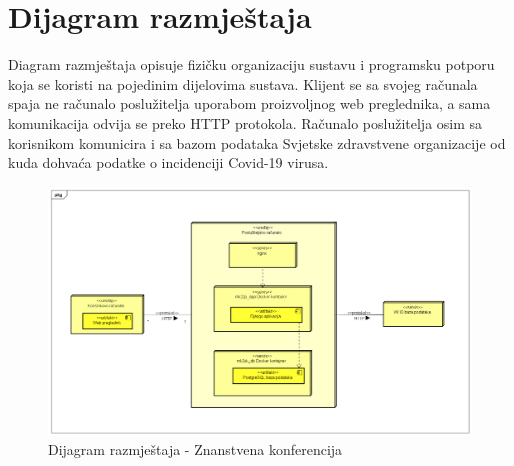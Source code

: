 		
		\section{Dijagram razmještaja}
		
		Diagram razmještaja opisuje fizičku organizaciju sustavu i programsku potporu koja se koristi na pojedinim dijelovima sustava. Klijent se sa svojeg računala spaja ne računalo poslužitelja uporabom proizvoljnog web preglednika, a sama komunikacija odvija se preko HTTP protokola. Računalo poslužitelja osim sa korisnikom komunicira i sa bazom podataka Svjetske zdravstvene organizacije od kuda dohvaća podatke o incidenciji Covid-19 virusa.
			 
			 
			\begin{figure}[H]
			 	\includegraphics[width= 15 cm, height= 25 cm, keepaspectratio]{dijagrami/Diagram razmjestaja.png} 
			 	\centering
			 	\caption{Dijagram razmještaja - Znanstvena konferencija}
			 	\label{fig:act5}
			 \end{figure}
			
